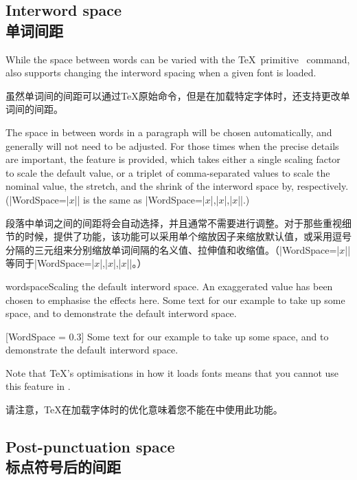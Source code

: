 \documentclass[a4paper]{l3doc}
\begin{document}
\subsection{Interword space\\单词间距}

While the space between words can be varied with the \TeX\ primitive
\cmd\spaceskip\ command,  also supports changing the
interword spacing when a given font is loaded.

虽然单词间的间距可以通过\TeX 原始命令\cmd{}，但是在加载特定字体时，还支持更改单词间的间距。

The space in between words in a paragraph will be chosen automatically,
and generally will not need to be adjusted. For those
times when the precise details are important, the 
feature is
provided, which takes either a single scaling factor to scale the
default value, or a triplet of comma-separated
values to scale the nominal value, the stretch, and the shrink of the
interword space by, respectively. (|WordSpace={|$x$|}| is the same as
|WordSpace={|$x$|,|$x$|,|$x$|}|.)

段落中单词之间的间距将会自动选择，并且通常不需要进行调整。对于那些重视细节的时候，提供了功能，该功能可以采用单个缩放因子来缩放默认值，或采用逗号分隔的三元组来分别缩放单词间隔的名义值、拉伸值和收缩值。（|WordSpace={|$x$|}|等同于|WordSpace={|$x$|,|$x$|,|$x$|}|。）


\begingroup
\let\centering\relax
\begin{Xexample}{wordspace}{Scaling the default interword space. An exaggerated value has been chosen to emphasise the effects here.}
  Some text for our example to take
  up some space, and to demonstrate
  the default interword space.
  \bigskip

    [WordSpace = 0.3]
  Some text for our example to take
  up some space, and to demonstrate
  the default interword space.
\end{Xexample}
\endgroup

Note that \TeX's optimisations in how it loads fonts means that you cannot
use this feature in .

请注意，\TeX 在加载字体时的优化意味着您不能在中使用此功能。


\subsection{Post-punctuation space\\标点符号后的间距}
\end{document}
